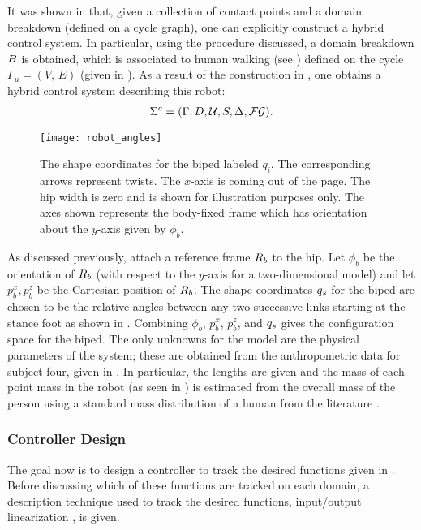 It was shown in  that, given a collection of contact
points and a domain breakdown (defined on a cycle graph), one can explicitly
construct a hybrid control system.
%
In particular, using the procedure discussed, a domain breakdown $B$ is
obtained, which is associated to human walking (see
) defined on the cycle $\Gamma_u = (V, \, E)$ (given
in ).
%
As a result of the construction in , one obtains a
hybrid control system describing this robot:
%
\begin{align}
  \label{eq:hcstime}
  \Sigma^{c} = (\Gamma, D, \mathcal{U}, S, \Delta, \mathcal{FG}).
\end{align}
%
\begin{figure}[t!]
  \centering
  \texttt{[image: robot\_angles]}
  \caption[The shape coordinates for the biped labeled $q_i$.]{The shape
    coordinates for the biped labeled $q_i$.
    The corresponding arrows represent twists. The $x$-axis is coming out of the
    page.
    The hip width is zero and is shown for illustration purposes only.
    The axes shown represents the body-fixed frame which has orientation about
    the $y$-axis given by $\phi_b$.}
  \label{fig:shapecoords}
\end{figure}
%
As discussed previously, attach a reference frame $R_{b}$ to the hip. Let $\phi_b$
be the orientation of $R_{b}$ (with respect to the $y$-axis for a two-dimensional
model) and let $p_b^x, p_b^z$ be the Cartesian position of $R_{b}$.
%
The shape coordinates $q_{s}$ for the biped are chosen to be the relative angles
between any two successive links starting at the stance foot as shown in
.
%
Combining $\phi_b$, $p_b^x$, $p_b^z$, and $q_{s}$ gives the configuration space
for the biped.
%
The only unknowns for the model are the physical parameters of the system;
%
these are obtained from the anthropometric data for subject four, given in
.
%
In particular, the lengths are given and the mass of each point mass in the
robot (as seen in ) is estimated from the overall
mass of the person using a standard mass distribution of a human from the
literature \cite{Winter2009}.

\subsubsection{Controller Design}
The goal now is to design a controller to track the desired functions given in
.
%
Before discussing which of these functions are tracked on each domain, a
description technique used to track the desired functions, input/output
linearization \cite[Ch.~9]{Sastry1999}, is given. %

